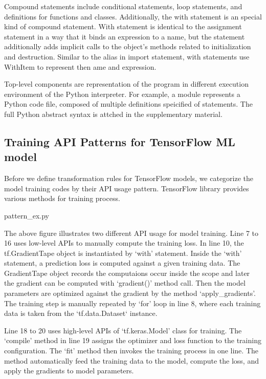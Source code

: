 Compound statements include conditional statements, loop statements,
and definitions for functions and classes.
Additionally, the with statement is an special kind of compound statement.
With statement is identical to the assignment statement 
in a way that it binds an expression to a name, 
but the statement additionally adds implicit calls
to the object's methods related to initialization and destruction.
Similar to the alias in import statement,
with statements use WithItem to represent then ame and expression.

Top-level components are representation of the program
in different execution environment of the Python interpreter.
For example, a module represents a Python code file, composed of
multiple definitions speicified of statements. 
The full Python abstract syntax is attched in the supplementary material.

\subsection{Training API Patterns for TensorFlow ML model}

Before we define transformation rules for TensorFlow models,
we categorize the model training codes by their API usage pattern.
TensorFlow library provides various methods for training process.


{pattern_ex.py}

The above figure illustrates two different API usage for model training.
Line 7 to 16 uses low-level APIs to manually compute the training loss.
In line 10, the tf.GradientTape object is instantiated by `with' statement.
Inside the `with' statement, a prediction loss is computed against
a given training data.
The GradientTape object records the computaions occur inside the scope
and later the gradient can be computed with `gradient()' method call.
Then the model parameters are optimized against the gradient
by the method `apply\_gradients'.
The training step is manually repeated by `for' loop in line 8,
where each training data is taken from the `tf.data.Dataset` instance.

Line 18 to 20 uses high-level APIs of `tf.keras.Model' class for training.
The `compile' method in line 19 assigns the optimizer and loss
function to the training configuration.
The `fit' method then invokes the training process in one line.
The method automatically feed the training data to the model,
compute the loss, and apply the gradients to model parameters.

